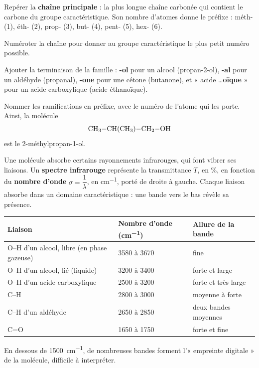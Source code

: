 \begin{savoirfaire}
\begin{questions}
\item Repérer la \textbf{chaîne principale} : la plus longue chaîne carbonée qui contient le carbone du groupe caractéristique.
Son nombre d'atomes donne le préfixe : méth- (1), éth- (2), prop- (3), but- (4), pent- (5), hex- (6).
\item Numéroter la chaîne pour donner au groupe caractéristique le plus petit numéro possible.
\item Ajouter la terminaison de la famille : \textbf{-ol} pour un alcool (propan-2-ol), \textbf{-al} pour un aldéhyde (propanal),
\textbf{-one} pour une cétone (butanone), et « acide \dots\textbf{oïque} » pour un acide carboxylique (acide éthanoïque).
\item Nommer les ramifications en préfixe, avec le numéro de l'atome qui les porte. Ainsi, la molécule
\[\ce{CH3-CH(CH3)-CH2-OH}\]
est le 2-méthylpropan-1-ol.
\end{questions}
\end{savoirfaire}
\begin{definition}
Une molécule absorbe certains rayonnements infrarouges, qui font vibrer ses liaisons. Un \textbf{spectre infrarouge} représente
la transmittance $T$, en \%, en fonction du \textbf{nombre d'onde} $\sigma=\dfrac{1}{\lambda}$, en \unit{cm^{-1}}, porté de droite à gauche. Chaque
liaison absorbe dans un domaine caractéristique : une bande vers le bas révèle sa présence.
\end{definition}
\begin{propriete}
\par\smallskip\noindent\hfill\begin{tabular}{lll}
\toprule
Liaison & Nombre d'onde (\unit{cm^{-1}}) & Allure de la bande \\
\midrule
O--H d'un alcool, libre (en phase gazeuse) & 3580 à 3670 & fine \\
O--H d'un alcool, lié (liquide) & 3200 à 3400 & forte et large \\
O--H d'un acide carboxylique & 2500 à 3200 & forte et très large \\
C--H & 2800 à 3000 & moyenne à forte \\
C--H d'un aldéhyde & 2650 à 2850 & deux bandes moyennes \\
C=O & 1650 à 1750 & forte et fine \\
\bottomrule
\end{tabular}\hfill\null\par\smallskip
En dessous de \qty{1500}{cm^{-1}}, de nombreuses bandes forment l'« empreinte digitale » de la molécule, difficile à interpréter.
\end{propriete}
